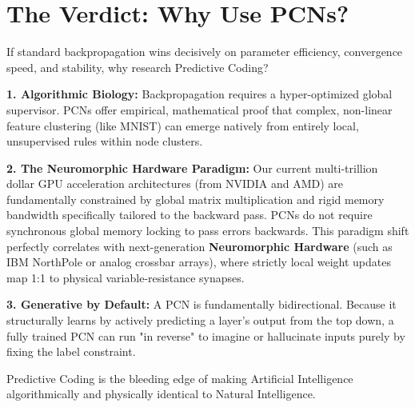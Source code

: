 \documentclass[12pt]{article}
\begin{document}
\section*{The Verdict: Why Use PCNs?}

If standard backpropagation wins decisively on parameter efficiency, convergence speed, and stability, why research Predictive Coding? 

\textbf{1. Algorithmic Biology:} Backpropagation requires a hyper-optimized global supervisor. PCNs offer empirical, mathematical proof that complex, non-linear feature clustering (like MNIST) can emerge natively from entirely local, unsupervised rules within node clusters. 

\textbf{2. The Neuromorphic Hardware Paradigm:} Our current multi-trillion dollar GPU acceleration architectures (from NVIDIA and AMD) are fundamentally constrained by global matrix multiplication and rigid memory bandwidth specifically tailored to the backward pass. PCNs do not require synchronous global memory locking to pass errors backwards. This paradigm shift perfectly correlates with next-generation \textbf{Neuromorphic Hardware} (such as IBM NorthPole or analog crossbar arrays), where strictly local weight updates map 1:1 to physical variable-resistance synapses. 

\textbf{3. Generative by Default:} A PCN is fundamentally bidirectional. Because it structurally learns by actively predicting a layer's output from the top down, a fully trained PCN can run "in reverse" to imagine or hallucinate inputs purely by fixing the label constraint.

Predictive Coding is the bleeding edge of making Artificial Intelligence algorithmically and physically identical to Natural Intelligence.
\end{document}
